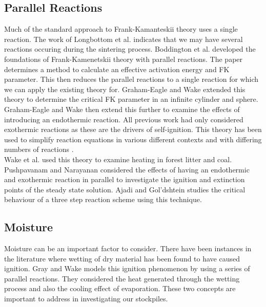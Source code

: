 \subsection{Parallel Reactions}
Much of the standard approach to Frank-Kamanteskii theory uses a single reaction. The work of Longbottom et al. \cite{Ray19} indicates that we may have several reactions occuring during the sintering process. Boddington et al. \cite{bodd84} developed the foundations of Frank-Kamenetskii theory with parallel reactions. The paper determines a method to calculate an effective activation energy and FK parameter. This then reduces the parallel reactions to a single reaction for which we can apply the existing theory for. Graham-Eagle and Wake \cite{GE85} extended this theory to determine the critical FK parameter in an infinite cylinder and sphere. Graham-Eagle and Wake \cite{GE86} then extend this further to examine the effects of introducing an endothermic reaction. All previous work had only considered exothermic reactions as these are the drivers of self-ignition. This theory has been used to simplify reaction equations in various different contexts and with differing numbers of reactions \cite{wake92,push89,ajadi09,jones91}. \\

Wake et al. \cite{wake92} used this theory to examine heating in forest litter and coal. Pushpavanam and Narayanan \cite{push89} considered the effects of having an endothermic and exothermic reaction in parallel to investigate the ignition and extinction points of the steady state solution. Ajadi and Gol'dshtein \cite{ajadi09} studies the critical behaviour of a three step reaction scheme using this technique.  
 

\subsection{Moisture}
Moisture can be an important factor to consider. There have been instances in the literature \cite{back81,walker67,lohrer05} where wetting of dry material has been found to have caused ignition. Gray and Wake \cite{gray90} models this ignition phenomenon by using a series of parallel reactions. They considered the heat generated through the wetting process and also the cooling effect of evaporation. These two concepts are important to address in investigating our stockpiles. 

